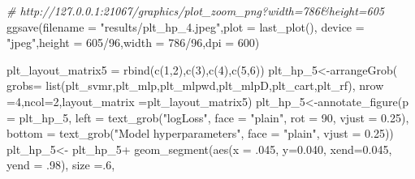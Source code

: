 \documentclass[
]{article}
\newenvironment{Shaded}{\begin{snugshade}}{\end{snugshade}}
\newcommand{\AttributeTok}[1]{\textcolor[rgb]{0.77,0.63,0.00}{#1}}
\newcommand{\CommentTok}[1]{\textcolor[rgb]{0.56,0.35,0.01}{\textit{#1}}}
\newcommand{\DecValTok}[1]{\textcolor[rgb]{0.00,0.00,0.81}{#1}}
\newcommand{\FloatTok}[1]{\textcolor[rgb]{0.00,0.00,0.81}{#1}}
\newcommand{\FunctionTok}[1]{\textcolor[rgb]{0.00,0.00,0.00}{#1}}
\newcommand{\NormalTok}[1]{#1}
\newcommand{\OtherTok}[1]{\textcolor[rgb]{0.56,0.35,0.01}{#1}}
\newcommand{\SpecialCharTok}[1]{\textcolor[rgb]{0.00,0.00,0.00}{#1}}
\newcommand{\StringTok}[1]{\textcolor[rgb]{0.31,0.60,0.02}{#1}}
\begin{document}
\begin{Shaded}
\begin{Highlighting}[]
\CommentTok{\# http://127.0.0.1:21067/graphics/plot\_zoom\_png?width=786\&height=605}
\FunctionTok{ggsave}\NormalTok{(}\AttributeTok{filename =} \StringTok{"results/plt\_hp\_4.jpeg"}\NormalTok{,}\AttributeTok{plot =} \FunctionTok{last\_plot}\NormalTok{(),}
       \AttributeTok{device =} \StringTok{"jpeg"}\NormalTok{,}\AttributeTok{height =} \DecValTok{605}\SpecialCharTok{/}\DecValTok{96}\NormalTok{,}\AttributeTok{width =} \DecValTok{786}\SpecialCharTok{/}\DecValTok{96}\NormalTok{,}\AttributeTok{dpi =} \DecValTok{600}\NormalTok{)}

\NormalTok{plt\_layout\_matrix5 }\OtherTok{=} \FunctionTok{rbind}\NormalTok{(}\FunctionTok{c}\NormalTok{(}\DecValTok{1}\NormalTok{,}\DecValTok{2}\NormalTok{),}\FunctionTok{c}\NormalTok{(}\DecValTok{3}\NormalTok{),}\FunctionTok{c}\NormalTok{(}\DecValTok{4}\NormalTok{),}\FunctionTok{c}\NormalTok{(}\DecValTok{5}\NormalTok{,}\DecValTok{6}\NormalTok{))}
\NormalTok{plt\_hp\_5}\OtherTok{\textless{}{-}}\FunctionTok{arrangeGrob}\NormalTok{(}
  \AttributeTok{grobs=} \FunctionTok{list}\NormalTok{(plt\_svmr,plt\_mlp,plt\_mlpwd,plt\_mlpD,plt\_cart,plt\_rf),}
                         \AttributeTok{nrow =}\DecValTok{4}\NormalTok{,}\AttributeTok{ncol=}\DecValTok{2}\NormalTok{,}\AttributeTok{layout\_matrix =}\NormalTok{plt\_layout\_matrix5)}
\NormalTok{plt\_hp\_5}\OtherTok{\textless{}{-}}\FunctionTok{annotate\_figure}\NormalTok{(}\AttributeTok{p =}\NormalTok{ plt\_hp\_5,}
                            \AttributeTok{left =} \FunctionTok{text\_grob}\NormalTok{(}\StringTok{"logLoss"}\NormalTok{, }\AttributeTok{face =} \StringTok{"plain"}\NormalTok{,}
                                             \AttributeTok{rot =} \DecValTok{90}\NormalTok{, }\AttributeTok{vjust =} \FloatTok{0.25}\NormalTok{),}
                            \AttributeTok{bottom =} \FunctionTok{text\_grob}\NormalTok{(}\StringTok{"Model hyperparameters"}\NormalTok{,}
                                               \AttributeTok{face =} \StringTok{"plain"}\NormalTok{, }\AttributeTok{vjust =} \FloatTok{0.25}\NormalTok{))}
\NormalTok{plt\_hp\_5}\OtherTok{\textless{}{-}}\NormalTok{ plt\_hp\_5}\SpecialCharTok{+}
  \FunctionTok{geom\_segment}\NormalTok{(}\FunctionTok{aes}\NormalTok{(}\AttributeTok{x =}\NormalTok{ .}\DecValTok{045}\NormalTok{, }\AttributeTok{y=}\FloatTok{0.040}\NormalTok{, }\AttributeTok{xend=}\FloatTok{0.045}\NormalTok{, }\AttributeTok{yend =}\NormalTok{ .}\DecValTok{98}\NormalTok{), }\AttributeTok{size =}\NormalTok{.}\DecValTok{6}\NormalTok{,}

\end{Highlighting}
\end{Shaded}
\end{document}
